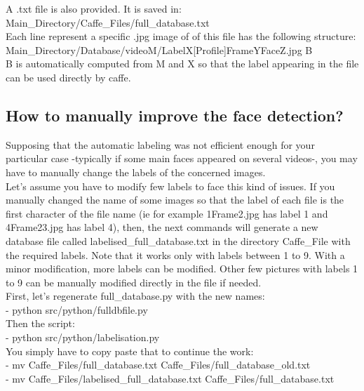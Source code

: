 A .txt file is also provided. It is saved in:\\

Main\_Directory/Caffe\_Files/full\_database.txt\\

Each line represent a specific .jpg image of of this file has the following structure:\\

Main\_Directory/Database/videoM/LabelX[Profile]FrameYFaceZ.jpg B\\

B is automatically computed from M and X so that the label appearing in the file can be used directly by caffe.

\subsection{How to manually improve the face detection?}

Supposing that the automatic labeling was not efficient enough for your particular case -typically if some main faces appeared on several videos-, you may have to manually change the labels of the concerned images.\\

Let’s assume you have to modify few labels to face this kind of issues. If you manually changed the name of some images so that the label of each file is the first character of the file name (ie for example 1Frame2.jpg has label 1 and 4Frame23.jpg has label 4), then, the next commands will generate a new database file called labelised\_full\_database.txt in the directory Caffe\_File with the required labels. Note that it works only with labels between 1 to 9. With a minor modification, more labels can be modified. Other few pictures with labels 1 to 9 can be manually modified directly in the file if needed.\\


First, let’s regenerate full\_database.py with the new names:\\
- python src/python/fulldbfile.py\\

Then the script:\\
- python src/python/labelisation.py\\

You simply have to copy paste that to continue the work: \\

- mv Caffe\_Files/full\_database.txt Caffe\_Files/full\_database\_old.txt\\
- mv Caffe\_Files/labelised\_full\_database.txt Caffe\_Files/full\_database.txt

